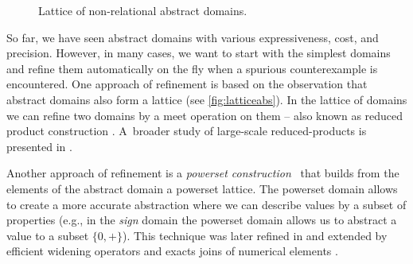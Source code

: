 \begin{figure}%
    \centering
    \caption{Lattice of non-relational abstract domains.}
    \label{fig:latticeabs}%
\end{figure}%

So far, we have seen abstract domains with various expressiveness, cost, and
precision. However, in many cases, we want to start with the simplest domains
and refine them automatically on the fly when a spurious counterexample is
encountered. One approach of refinement is based on the observation that
abstract domains also form a lattice (see \autoref{fig:latticeabs}). In the lattice
of domains we can refine two domains by a meet operation on them -- also known
as reduced product construction \cite{Toubhans2013, Cousot2011b}. A~broader
study of large-scale reduced-products is presented in \cite{Cousot2007}.

Another approach of refinement is a \emph{powerset construction}~\cite{Cousot1979}
that builds from the elements of the abstract domain a powerset lattice. The
powerset domain allows to create a more accurate abstraction where we can
describe values by a subset of properties (e.g., in the \textit{sign} domain
the powerset domain allows us to abstract a value to a subset $\{0, +\}$).  This
technique was later refined in \cite{File1999} and extended by efficient
widening operators \cite{Bagnara2004} and exacts joins of numerical elements
\cite{Bagnara2010}.

